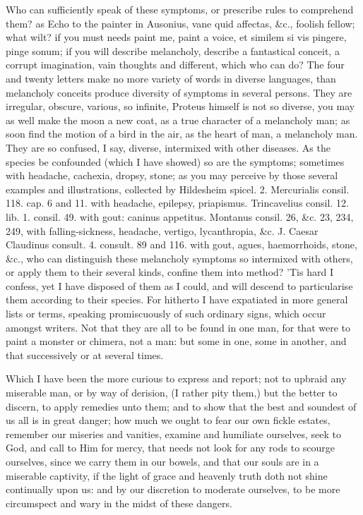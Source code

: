 {Who can sufficiently speak of these symptoms, or prescribe rules to
comprehend them? as Echo to the painter in Ausonius, vane quid
affectas, \&c., foolish fellow; what wilt? if you must needs paint me,
paint a voice, et similem si vis pingere, pinge sonum; if you will
describe melancholy, describe a fantastical conceit, a corrupt
imagination, vain thoughts and different, which who can do? The four
and twenty letters make no more variety of words in diverse languages,
than melancholy conceits produce diversity of symptoms in several
persons. They are irregular, obscure, various, so infinite, Proteus
himself is not so diverse, you may as well make the moon a new coat, as
a true character of a melancholy man; as soon find the motion of a bird
in the air, as the heart of man, a melancholy man. They are so
confused, I say, diverse, intermixed with other diseases. As the
species be confounded (which I have showed) so are the symptoms;
sometimes with headache, cachexia, dropsy, stone; as you may perceive
by those several examples and illustrations, collected by 
Hildesheim spicel. 2. Mercurialis consil. 118. cap. 6 and 11. with
headache, epilepsy, priapismus. Trincavelius consil. 12. lib. 1.
consil. 49. with gout: caninus appetitus. Montanus consil. 26, \&c. 23,
234, 249, with falling-sickness, headache, vertigo, lycanthropia, \&c.
J. Caesar Claudinus consult. 4. consult. 89 and 116. with gout, agues,
haemorrhoids, stone, \&c., who can distinguish these melancholy symptoms
so intermixed with others, or apply them to their several kinds,
confine them into method? 'Tis hard I confess, yet I have disposed of
them as I could, and will descend to particularise them according to
their species. For hitherto I have expatiated in more general lists or
terms, speaking promiscuously of such ordinary signs, which occur
amongst writers. Not that they are all to be found in one man, for that
were to paint a monster or chimera, not a man: but some in one, some in
another, and that successively or at several times.

Which I have been the more curious to express and report; not to
upbraid any miserable man, or by way of derision, (I rather pity them,)
but the better to discern, to apply remedies unto them; and to show
that the best and soundest of us all is in great danger; how much we
ought to fear our own fickle estates, remember our miseries and
vanities, examine and humiliate ourselves, seek to God, and call to Him
for mercy, that needs not look for any rods to scourge ourselves, since
we carry them in our bowels, and that our souls are in a miserable
captivity, if the light of grace and heavenly truth doth not shine
continually upon us: and by our discretion to moderate ourselves, to be
more circumspect and wary in the midst of these dangers.

}
